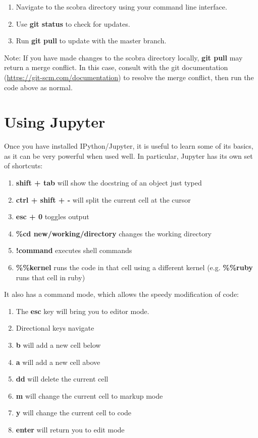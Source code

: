 \begin{enumerate}
\item Navigate to the scobra directory using your command line interface.
\item Use \textbf{git status} to check for updates.
\item Run \textbf{git pull} to update with the master branch.
\end{enumerate}

Note: If you have made changes to the scobra directory locally, \textbf{git pull} may return a merge conflict. In this case, consult with the git documentation (\url{https://git-scm.com/documentation}) to resolve the merge conflict, then run the code above as normal.


\section{Using Jupyter}

Once you have installed IPython/Jupyter, it is useful to learn some of its basics, as it can be very powerful when used well. In particular, Jupyter has its own set of shortcuts:

\begin{enumerate}
\item \textbf{shift + tab} will show the docstring of an object just typed
\item \textbf{ctrl + shift + -} will split the current cell at the cursor
\item \textbf{esc + 0} toggles output
\item \textbf{\%cd new/working/directory} changes the working directory
\item \textbf{!command} executes shell commands
\item \textbf{\%\%kernel} runs the code in that cell using a different kernel (e.g. \textbf{\%\%ruby} runs that cell in ruby)
\end{enumerate}

It also has a command mode, which allows the speedy modification of code:

\begin{enumerate}
\item The \textbf{esc} key will bring you to editor mode. 
\item Directional keys navigate
\item \textbf{b} will add a new cell below
\item \textbf{a} will add a new cell above
\item \textbf{dd} will delete the current cell
\item \textbf{m} will change the current cell to markup mode
\item \textbf{y} will change the current cell to code
\item \textbf{enter} will return you to edit mode
\end{enumerate}


